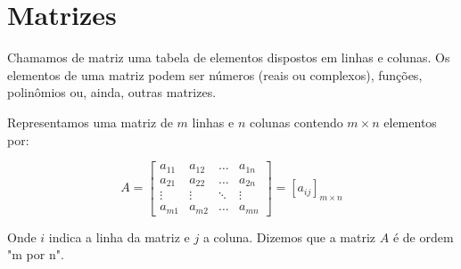 \chapter{Matrizes}

Chamamos de matriz uma tabela de elementos dispostos em linhas e colunas. Os elementos de uma matriz podem ser números (reais ou complexos), funções, polinômios ou, ainda, outras matrizes.

Representamos uma matriz de $m$ linhas e $n$ colunas contendo $m \times n$ elementos por:

$$A =
\begin{bmatrix}
a_{11} & a_{12} & \ldots & a_{1n} \\
a_{21} & a_{22} & \ldots & a_{2n} \\
\vdots & \vdots & \ddots & \vdots \\
a_{m1} & a_{m2} & \ldots & a_{mn}
\end{bmatrix} = [a_{ij}]_{m \times n}$$ 

Onde $i$ indica a linha da matriz e $j$ a coluna. Dizemos que a matriz $A$ é de ordem "m por n".